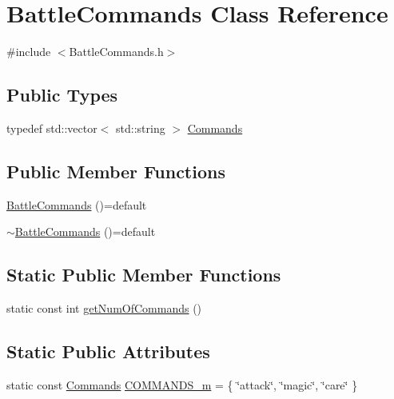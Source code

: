 \hypertarget{class_battle_commands}{}\section{Battle\+Commands Class Reference}
\label{class_battle_commands}


{\ttfamily \#include $<$Battle\+Commands.\+h$>$}

\subsection*{Public Types}
\begin{DoxyCompactItemize}
\item 
typedef std\+::vector$<$ std\+::string $>$ \hyperlink{class_battle_commands_a173465cbf126339d45ef1e119dfa8f97}{Commands}
\end{DoxyCompactItemize}
\subsection*{Public Member Functions}
\begin{DoxyCompactItemize}
\item 
\hyperlink{class_battle_commands_a7e326bb12b3895ee69ce6120811f6d2a}{Battle\+Commands} ()=default
\item 
\hyperlink{class_battle_commands_aa58510d9aa1c4a2f14c35c095e32f212}{$\sim$\+Battle\+Commands} ()=default
\end{DoxyCompactItemize}
\subsection*{Static Public Member Functions}
\begin{DoxyCompactItemize}
\item 
static const int \hyperlink{class_battle_commands_a545df551d5dd5ec5212a4c2d32a125e9}{get\+Num\+Of\+Commands} ()
\end{DoxyCompactItemize}
\subsection*{Static Public Attributes}
\begin{DoxyCompactItemize}
\item 
static const \hyperlink{class_battle_commands_a173465cbf126339d45ef1e119dfa8f97}{Commands} \hyperlink{class_battle_commands_ad187150249ca899f0f6cd16cd8052d0f}{C\+O\+M\+M\+A\+N\+D\+S\+\_\+m} = \{ \char`\"{}attack\char`\"{}, \char`\"{}magic\char`\"{}, \char`\"{}care\char`\"{} \}
\end{DoxyCompactItemize}


